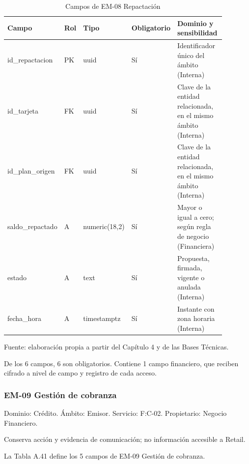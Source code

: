 \documentclass[11pt]{article}
\begin{document}
\begin{table}[htbp]
\caption{Campos de EM-08 Repactación}\label{tab:d_em08}
\centering
\begin{tabular}{@{}p{0.167\linewidth}p{0.070\linewidth}p{0.079\linewidth}p{0.097\linewidth}p{0.465\linewidth}@{}}
\toprule Campo & Rol & Tipo & Obligatorio & Dominio y sensibilidad \\
\midrule
id\_repactacion & PK & uuid & Sí & Identificador único del ámbito (Interna) \\
id\_tarjeta & FK & uuid & Sí & Clave de la entidad relacionada, en el mismo ámbito (Interna) \\
id\_plan\_origen & FK & uuid & Sí & Clave de la entidad relacionada, en el mismo ámbito (Interna) \\
saldo\_repactado & A & numeric(18,2) & Sí & Mayor o igual a cero; según regla de negocio (Financiera) \\
estado & A & text & Sí & Propuesta, firmada, vigente o anulada (Interna) \\
fecha\_hora & A & timestamptz & Sí & Instante con zona horaria (Interna) \\
\bottomrule
\end{tabular}
\par\smallskip
{\raggedright Fuente: elaboración propia a partir del Capítulo 4 y de las Bases Técnicas.\par}
\end{table}


De los 6 campos, 6 son obligatorios. Contiene 1 campo financiero, que reciben cifrado a nivel de campo y registro de cada acceso.

\subsubsection{EM-09 Gestión de cobranza}

Dominio: Crédito. Ámbito: Emisor. Servicio: F:C-02. Propietario: Negocio Financiero.

Conserva acción y evidencia de comunicación; no información accesible a Retail.

La Tabla A.41 define los 5 campos de EM-09 Gestión de cobranza.
\end{document}
